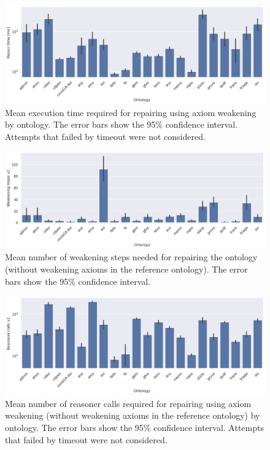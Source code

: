 \begin{figure}[htbp]
  \centering
  \includegraphics[width=\textwidth]{resources/time-ontology-bar.png}
  \caption{Mean execution time required for repairing using axiom weakening by ontology. The error bars show the 95\% confidence interval. Attempts that failed by timeout were not considered.}
\end{figure}

\begin{figure}[htbp]
  \centering
  \includegraphics[width=\textwidth]{resources/steps-enhance-ontology-bar.png}
  \caption{Mean number of weakening steps needed for repairing the ontology (without weakening axioms in the reference ontology). The error bars show the 95\% confidence interval.}
\end{figure}

\begin{figure}[htbp]
  \centering
  \includegraphics[width=\textwidth]{resources/calls-enhance-ontology-bar.png}
  \caption{Mean number of reasoner calls required for repairing using axiom weakening (without weakening axioms in the reference ontology) by ontology. The error bars show the 95\% confidence interval. Attempts that failed by timeout were not considered.}
\end{figure}

